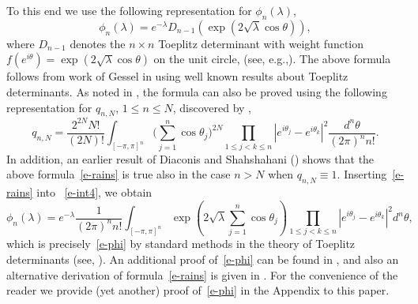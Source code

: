 \documentclass{amsart}
\theoremstyle{definition}
\theoremstyle{remark}
\numberwithin{equation}{section}
\begin{document}
To this end we use the following representation for $\phi_n(\lambda)$, 
\begin{equation}\label{e-phi}
    \phi_n(\lambda) 
    = e^{-\lambda} D_{n-1}(\exp(2\sqrt{\lambda}\cos{\theta})), 
\end{equation}
where $D_{n-1}$ denotes the $n\times n$ Toeplitz determinant
with weight function $f(e^{i\theta})=\exp(2\sqrt{\lambda}\cos{\theta})$
on the unit circle, (see, e.g.,\cite{Sz}).
The above formula follows from work of Gessel in \cite{Ge} using well known 
results about Toeplitz determinants.
As noted in \cite{Johan}, the formula can also be proved using 
the following representation for $q_{n,N}$, $1\le n\le N$, 
discovered by \cite{OPWW}, 
\begin{equation}\label{e-rains}
   q_{n,N}=\frac{2^{2N}N!}{(2N)!}
\int_{[-\pi,\pi]^n} \bigl( \sum_{j=1}^{n} \cos\theta_j \bigr)^{2N}
\prod_{1\le j<k\le n} |e^{i\theta_j}-e^{i\theta_k}|^2
\frac{d^n\theta}{(2\pi)^nn!}.
\end{equation}
In addition, an earlier result of Diaconis and Shahshahani (\cite{DS}) shows 
that the above formula~\eqref{e-rains} is true also in the case 
$n>N$ when $q_{n,N}\equiv 1$. 
Inserting~\eqref{e-rains} into ~\eqref{e-int4}, we obtain 
\begin{equation}\label{e-DiS}
    \phi_n(\lambda) = e^{-\lambda} \frac{1}{(2\pi)^nn!} 
\int_{[-\pi,\pi]^n}\exp(2\sqrt{\lambda}\sum_{j=1}^{n} \cos{\theta_j}) 
\prod_{1\leq j<k \leq n} |e^{i\theta_j}-e^{i\theta_k}|^2 d^n\!\theta, 
\end{equation}
which is precisely~\eqref{e-phi} by standard methods in the theory of 
Toeplitz determinants (see, \cite{Sz}).
An additional proof of~\eqref{e-phi} can be found in \cite{GWW}, and 
also an alternative derivation of formula~\eqref{e-rains} is given 
in \cite{Rains}.
For the convenience of the reader we provide (yet another) 
proof of~\eqref{e-phi} 
in the Appendix to this paper.
\end{document}
